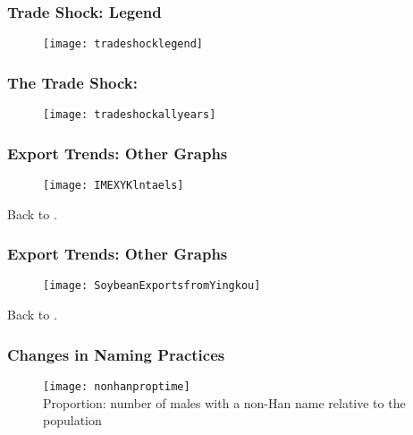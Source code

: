 \begin{frame}[label = tradeshocklegend]
\frametitle{Trade Shock: Legend \hyperlink{tradeshock}{} \hyperlink{data}{}}
\begin{figure}[h!]
\texttt{[image: tradeshocklegend]}\\
{\tiny }
\end{figure}
\end{frame}

\begin{frame}[label = tradeshock]
\frametitle{The Trade Shock: \hyperlink{tradeshocklegend}{} \hyperlink{data}{}}
\begin{figure}[h!]
\texttt{[image: tradeshockallyears]}\\
\end{figure}
\end{frame}




\begin{frame}[label=otherexportpics]
\frametitle{Export Trends: Other Graphs}
\begin{figure}[h!]
\texttt{[image: IMEXYKlntaels]}\\
\end{figure}
{\small 
Back to \hyperlink{data}{}.}
\end{frame}

\begin{frame}[label=otherexportpics]
\frametitle{Export Trends: Other Graphs}
\begin{figure}[h!]
\texttt{[image: SoybeanExportsfromYingkou]}\\
\end{figure}
{\small 
Back to \hyperlink{data}{}.}
\end{frame}

\begin{frame}[label = culture]
\frametitle{Changes in Naming Practices \hyperlink{data2}{}}
\begin{figure}[h!]
\texttt{[image: nonhanproptime]}\\
{\tiny Proportion: number of males with a non-Han name relative to the population}

\end{figure}

\end{frame}



